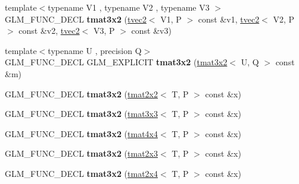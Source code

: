 \begin{DoxyCompactItemize}
\item 
\hypertarget{structglm_1_1tmat3x2_a12d9e62a09e2d082664841f719999405}{{\footnotesize template$<$typename V1 , typename V2 , typename V3 $>$ }\\G\-L\-M\-\_\-\-F\-U\-N\-C\-\_\-\-D\-E\-C\-L {\bfseries tmat3x2} (\hyperlink{structglm_1_1tvec2}{tvec2}$<$ V1, P $>$ const \&v1, \hyperlink{structglm_1_1tvec2}{tvec2}$<$ V2, P $>$ const \&v2, \hyperlink{structglm_1_1tvec2}{tvec2}$<$ V3, P $>$ const \&v3)}\label{structglm_1_1tmat3x2_a12d9e62a09e2d082664841f719999405}

\item 
\hypertarget{structglm_1_1tmat3x2_aca2535c7f0a60d41ce48c7cd0a7f83b9}{{\footnotesize template$<$typename U , precision Q$>$ }\\G\-L\-M\-\_\-\-F\-U\-N\-C\-\_\-\-D\-E\-C\-L G\-L\-M\-\_\-\-E\-X\-P\-L\-I\-C\-I\-T {\bfseries tmat3x2} (\hyperlink{structglm_1_1tmat3x2}{tmat3x2}$<$ U, Q $>$ const \&m)}\label{structglm_1_1tmat3x2_aca2535c7f0a60d41ce48c7cd0a7f83b9}

\item 
\hypertarget{structglm_1_1tmat3x2_a9af622af900c3ddb1a075d5083d700bd}{G\-L\-M\-\_\-\-F\-U\-N\-C\-\_\-\-D\-E\-C\-L {\bfseries tmat3x2} (\hyperlink{structglm_1_1tmat2x2}{tmat2x2}$<$ T, P $>$ const \&x)}\label{structglm_1_1tmat3x2_a9af622af900c3ddb1a075d5083d700bd}

\item 
\hypertarget{structglm_1_1tmat3x2_a3578a509c6af05bf0319417803261991}{G\-L\-M\-\_\-\-F\-U\-N\-C\-\_\-\-D\-E\-C\-L {\bfseries tmat3x2} (\hyperlink{structglm_1_1tmat3x3}{tmat3x3}$<$ T, P $>$ const \&x)}\label{structglm_1_1tmat3x2_a3578a509c6af05bf0319417803261991}

\item 
\hypertarget{structglm_1_1tmat3x2_ab66003b5f215e9eb712561b3b0ec39d2}{G\-L\-M\-\_\-\-F\-U\-N\-C\-\_\-\-D\-E\-C\-L {\bfseries tmat3x2} (\hyperlink{structglm_1_1tmat4x4}{tmat4x4}$<$ T, P $>$ const \&x)}\label{structglm_1_1tmat3x2_ab66003b5f215e9eb712561b3b0ec39d2}

\item 
\hypertarget{structglm_1_1tmat3x2_a1befb2e603dab6356eaf74504fa6bdfe}{G\-L\-M\-\_\-\-F\-U\-N\-C\-\_\-\-D\-E\-C\-L {\bfseries tmat3x2} (\hyperlink{structglm_1_1tmat2x3}{tmat2x3}$<$ T, P $>$ const \&x)}\label{structglm_1_1tmat3x2_a1befb2e603dab6356eaf74504fa6bdfe}

\item 
\hypertarget{structglm_1_1tmat3x2_abc4f2fcc9002757744b440948ad516ce}{G\-L\-M\-\_\-\-F\-U\-N\-C\-\_\-\-D\-E\-C\-L {\bfseries tmat3x2} (\hyperlink{structglm_1_1tmat2x4}{tmat2x4}$<$ T, P $>$ const \&x)}\label{structglm_1_1tmat3x2_abc4f2fcc9002757744b440948ad516ce}


\end{DoxyCompactItemize}
